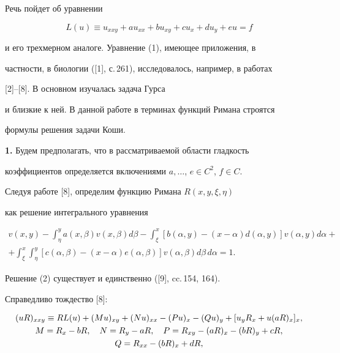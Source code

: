 Речь пойдет об уравнении


\begin{equation}


L(u)\equiv u_{xxy}+au_{xx}+bu_{xy}+cu_{x}+du_{y}+eu=f


\end{equation}


и его трехмерном аналоге. Уравнение (1), имеющее приложения, в


частности, в биологии ([1], с.\,261), исследовалось, например, в работах


[2]--[8]. В основном изучалась задача Гурса


и близкие к ней. В данной работе в терминах функций Римана строятся


формулы решения задачи Коши.


\medskip





{\bf 1.} Будем предполагать, что в рассматриваемой области гладкость


коэффициентов определяется включениями $a,\dotsc$, $e\in C^{2}$, $f\in C$.


Следуя работе [8], определим функцию Римана $R(x,y,\xi,\eta)$


как решение интегрального уравнения


\begin{multline}


v(x,y)-\int_{\eta}^{y} a(x,\beta) v(x,\beta) d\beta -


\int_{\xi}^{x} [b(\alpha,y) -(x-\alpha)d(\alpha,y)]v(\alpha,y)d\alpha+\\


+\int_{\xi}^{x} \int_{\eta}^{y} [c(\alpha,\beta) -(x-\alpha)e(\alpha,\beta)]


v(\alpha,\beta) d\beta\, d\alpha=1.


\end{multline}


Решение (2) существует и единственно ([9], cc.\,154, 164).





Справедливо тождество [8]:


\begin{gather}


(uR)_{xxy}\equiv RL(u)+(Mu)_{xy}+(Nu)_{xx}-(Pu)_{x}-(Qu)_{y}+


[u_{y}R_{x}+u(aR)_{x}]_{x}, \\


%


M=R_{x}-bR,\quad N=R_{y}-aR,\quad P=R_{xy}-(aR)_{x}-(bR)_{y}+cR,\notag \\


%


Q=R_{xx}-(bR)_{x}+dR,\notag


\end{gather}


